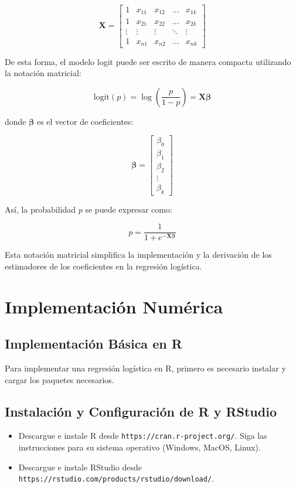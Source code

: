 \begin{equation}
\mathbf{X} = \begin{bmatrix}
1 & x_{11} & x_{12} & \ldots & x_{1k} \\
1 & x_{21} & x_{22} & \ldots & x_{2k} \\
\vdots & \vdots & \vdots & \ddots & \vdots \\
1 & x_{n1} & x_{n2} & \ldots & x_{nk}
\end{bmatrix}
\end{equation}

De esta forma, el modelo logit puede ser escrito de manera compacta utilizando la notación matricial:

\begin{equation}
\text{logit}(p) = \log\left(\frac{p}{1-p}\right) = \mathbf{X} \boldsymbol{\beta}
\end{equation}

donde $\boldsymbol{\beta}$ es el vector de coeficientes:

\begin{equation}
\boldsymbol{\beta} = \begin{bmatrix}
\beta_0 \\
\beta_1 \\
\beta_2 \\
\vdots \\
\beta_k
\end{bmatrix}
\end{equation}

Así, la probabilidad $p$ se puede expresar como:

\begin{equation}
p = \frac{1}{1 + e^{-\mathbf{X} \boldsymbol{\beta}}}
\end{equation}

Esta notación matricial simplifica la implementación y la derivación de los estimadores de los coeficientes en la regresión logística.

\section{Implementaci\'on Num\'erica}
\subsection*{Implementación Básica en R}

Para implementar una regresión logística en R, primero es necesario instalar y cargar los paquetes necesarios. 

\subsection*{Instalación y Configuración de R y RStudio}
\begin{itemize}
    \item Descargue e instale R desde \texttt{https://cran.r-project.org/}. Siga las instrucciones para su sistema operativo (Windows, MacOS, Linux).
    \item Descargue e instale RStudio desde \texttt{https://rstudio.com/products/rstudio/download/}. 
\end{itemize}

